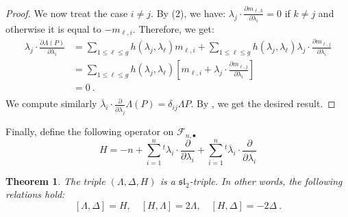 \documentclass[11pt,letterpaper,english]{amsart}
\numberwithin{equation}{subsection}
\numberwithin{equation}{section}
\newcommand\cF{{\mathcal F}}
\theoremstyle{plain}
\newtheorem{theorem}{Theorem}[section]
\theoremstyle{remark}
\begin{document}
\begin{proof}
We now treat the case $i\neq j$. By  (2), we have: $\lambda_j\cdot\frac{\partial m_{\ell,k}}{\partial \lambda_i}=0$ if $k\neq j$ and otherwise it is equal to $-m_{\ell,i}$. Therefore, we get:
\begin{align*}
 \lambda_j\cdot\frac{\partial \Lambda(P)}{\partial \lambda_i}&=\sum_{1\leq \ell\leq g} h(\lambda_j,\lambda_\ell)m_{\ell,i}+\sum_{{1\leq \ell\leq g}} h(\lambda_j,\lambda_\ell)\lambda_j\cdot\frac{\partial m_{\ell,j}}{\partial \lambda_i}\\
 &=\sum_{1\leq \ell\leq g} h(\lambda_j,\lambda_\ell)\left[m_{\ell,i}+\lambda_j\cdot\frac{\partial m_{\ell,j}}{\partial \lambda_i}\right]\\
 &=0~.\\
\end{align*}
We compute similarly $\overline{\lambda}_i\cdot\frac{\partial}{\partial \overline{\lambda_j}}\Lambda(P)=\delta_{ij}\Lambda P$. By , we get the desired result.
\end{proof}
Finally, define the following operator on $\cF_{n,\bullet}$ \[H=-n+\sum_{i=1}^{n}{ ^{t}}\lambda_i\cdot\frac{\partial}{\partial\lambda_i}+\sum_{i=1}^{n}{ ^{t}}\overline{\lambda}_i\cdot\frac{\partial}{\partial\overline{\lambda_i}}\]
\begin{theorem}\label{proposition-sl2}
    The triple $(\Lambda,\Delta,H)$ is a $\mathfrak{sl}_2$-triple. In other words, the following relations hold:
    \[[\Lambda,\Delta]=H,\quad  [H,\Lambda]= 2\Lambda,\quad [H,\Delta]=-2\Delta~.\]
\end{theorem}
\end{document}
